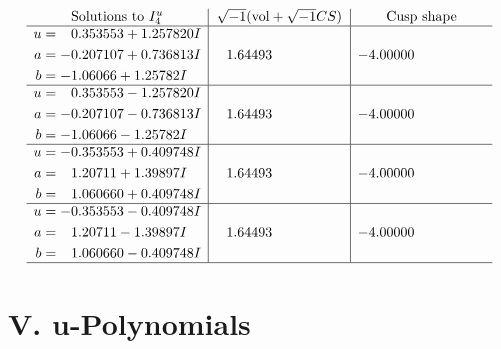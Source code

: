 \documentclass[1p]{elsarticle_modified}
\theoremstyle{definition}
\newcommand{\I}{\sqrt{-1}}
\begin{document}
$$\begin{array}{c|c|c}  
\text{Solutions to }I^u_{4}& \I (\text{vol} + \sqrt{-1}CS) & \text{Cusp shape}\\
 \hline 
\begin{aligned}
u &= \phantom{-}0.353553 + 1.257820 I \\
a &= -0.207107 + 0.736813 I \\
b &= -1.06066 + 1.25782 I\end{aligned}
 & \phantom{-}1.64493\phantom{ +0.000000I} & -4.00000\phantom{ +0.000000I} \\ \hline\begin{aligned}
u &= \phantom{-}0.353553 - 1.257820 I \\
a &= -0.207107 - 0.736813 I \\
b &= -1.06066 - 1.25782 I\end{aligned}
 & \phantom{-}1.64493\phantom{ +0.000000I} & -4.00000\phantom{ +0.000000I} \\ \hline\begin{aligned}
u &= -0.353553 + 0.409748 I \\
a &= \phantom{-}1.20711 + 1.39897 I \\
b &= \phantom{-}1.060660 + 0.409748 I\end{aligned}
 & \phantom{-}1.64493\phantom{ +0.000000I} & -4.00000\phantom{ +0.000000I} \\ \hline\begin{aligned}
u &= -0.353553 - 0.409748 I \\
a &= \phantom{-}1.20711 - 1.39897 I \\
b &= \phantom{-}1.060660 - 0.409748 I\end{aligned}
 & \phantom{-}1.64493\phantom{ +0.000000I} & -4.00000\phantom{ +0.000000I}\\
 \hline 
 \end{array}$$\newpage
\newpage\renewcommand{\arraystretch}{1}
\centering \section*{ V. u-Polynomials}
\end{document}
